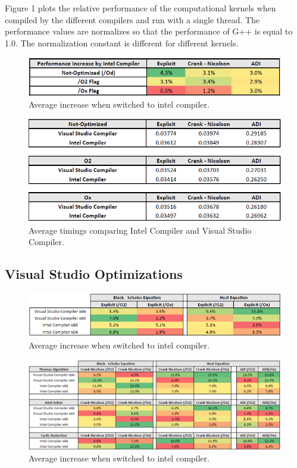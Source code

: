 \documentclass[12pt, oneside]{book}
\theoremstyle{plain}
\theoremstyle{definition}
\begin{document}
Figure 1 plots the relative performance of the computational kernels when compiled by the different compilers and run with a single thread. The performance values are normalizes so that the performance of G++ is equal to 1.0. The normalization constant is different for different kernels.

\begin{figure}[!htb]
    \centering
        \includegraphics[scale=0.8]{compilerPercent.png}
    \caption{Average increase when switched to intel compiler.}
\end{figure}

\begin{figure}[!htb]
    \centering
        \includegraphics[scale=0.8]{compilerT.png}
    \caption{Average timings comparing Intel Compiler and Visual Studio Compiler.}
\end{figure}

\subsection{Visual Studio Optimizations}
\begin{figure}[!htb]
    \centering
        \includegraphics[scale=0.7]{expFlagPercent.png}
    \caption{Average increase when switched to intel compiler.}
\end{figure}
\begin{figure}[!htb]
    \centering
        \includegraphics[scale=0.6]{FlagPercent.png}
    \caption{Average increase when switched to intel compiler.}
\end{figure}
\end{document}
